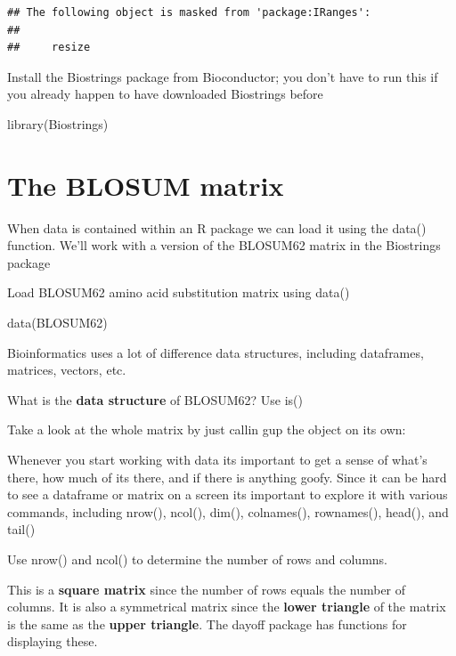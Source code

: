\documentclass[
]{book}
\newenvironment{Shaded}{\begin{snugshade}}{\end{snugshade}}
\newcommand{\FunctionTok}[1]{\textcolor[rgb]{0.00,0.00,0.00}{#1}}
\newcommand{\NormalTok}[1]{#1}
\begin{document}
\begin{verbatim}
## The following object is masked from 'package:IRanges':
## 
##     resize
\end{verbatim}

Install the Biostrings package from Bioconductor; you don't have to run this if you already happen to have downloaded Biostrings before

\begin{Shaded}
\begin{Highlighting}[]
\FunctionTok{library}\NormalTok{(Biostrings)}
\end{Highlighting}
\end{Shaded}

\hypertarget{the-blosum-matrix}{%
\section{The BLOSUM matrix}\label{the-blosum-matrix}}

When data is contained within an R package we can load it using the data() function. We'll work with a version of the BLOSUM62 matrix in the Biostrings package

Load BLOSUM62 amino acid substitution matrix using data()

\begin{Shaded}
\begin{Highlighting}[]
\FunctionTok{data}\NormalTok{(BLOSUM62)}
\end{Highlighting}
\end{Shaded}

Bioinformatics uses a lot of difference data structures, including dataframes, matrices, vectors, etc.

What is the \textbf{data structure} of BLOSUM62? Use is()

Take a look at the whole matrix by just callin gup the object on its own:

Whenever you start working with data its important to get a sense of what's there, how much of its there, and if there is anything goofy. Since it can be hard to see a dataframe or matrix on a screen its important to explore it with various commands, including nrow(), ncol(), dim(), colnames(), rownames(), head(), and tail()

Use nrow() and ncol() to determine the number of rows and columns.

This is a \textbf{square matrix} since the number of rows equals the number of columns. It is also a symmetrical matrix since the \textbf{lower triangle} of the matrix is the same as the \textbf{upper triangle}. The dayoff package has functions for displaying these.
\end{document}
